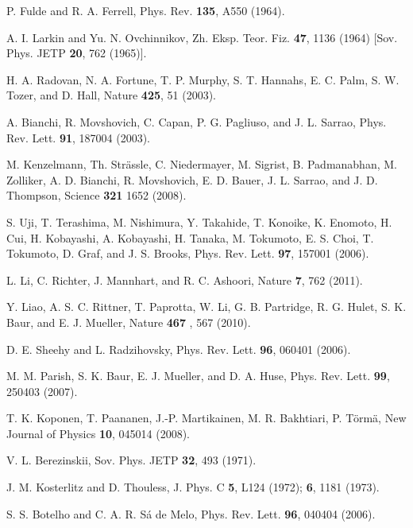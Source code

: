 \documentclass[prl,aps,twocolumn,showpacs, floatfix]{revtex4}
\begin{document}
\begin{thebibliography}{99}
 {P. Fulde and R. A. Ferrell, Phys. Rev. \textbf{135},
A550 (1964).}

 {A. I. Larkin and Yu. N. Ovchinnikov, Zh. Eksp. Teor.
Fiz. \textbf{47}, 1136 (1964) [Sov. Phys. JETP \textbf{20}, 762 (1965)].}

 {H. A. Radovan, N. A. Fortune, T. P. Murphy, S. T.
Hannahs, E. C. Palm, S. W. Tozer, and D. Hall, Nature \textbf{425}, 51
(2003).}

 {A. Bianchi, R. Movshovich, C. Capan, P. G. Pagliuso, and
J. L. Sarrao, Phys. Rev. Lett. \textbf{91}, 187004 (2003). }

 {M. Kenzelmann, Th. Str\"assle, C. Niedermayer, M.
Sigrist, B. Padmanabhan, M. Zolliker, A. D. Bianchi, R. Movshovich, E. D.
Bauer, J. L. Sarrao, and J. D. Thompson, Science \textbf{321} 1652 (2008). }

 {S. Uji, T. Terashima, M. Nishimura, Y. Takahide, T.
Konoike, K. Enomoto, H. Cui, H. Kobayashi, A. Kobayashi, H. Tanaka, M.
Tokumoto, E. S. Choi, T. Tokumoto, D. Graf, and J. S. Brooks, Phys. Rev.
Lett. \textbf{97}, 157001 (2006). }

 {L. Li, C. Richter, J. Mannhart, and R. C. Ashoori,
Nature \textbf{7}, 762 (2011). }

 {Y. Liao, A. S. C. Rittner, T. Paprotta, W. Li, G.
B. Partridge, R. G. Hulet, S. K. Baur, and E. J. Mueller, Nature \textbf{467}%
, 567 (2010). }

 {D. E. Sheehy and L. Radzihovsky, Phys. Rev. Lett.
\textbf{96}, 060401 (2006).}

 {M. M. Parish, S. K. Baur, E. J. Mueller, and D. A.
Huse, Phys. Rev. Lett. \textbf{99}, 250403 (2007).}

 {T. K. Koponen, T. Paananen, J.-P. Martikainen, M. R.
Bakhtiari, P. T\"{o}rm\"{a}, New Journal of Physics \textbf{10}, 045014
(2008).}

 {V. L. Berezinskii, Sov. Phys. JETP \textbf{32}, 493
(1971).}

 {J. M. Kosterlitz and D. Thouless, J. Phys. C \textbf{5},
L124 (1972); \textbf{6}, 1181 (1973).}

 {S. S. Botelho and C. A. R. S\'a de Melo, Phys. Rev. Lett.
\textbf{96}, 040404 (2006).}


\end{thebibliography}
\end{document}
